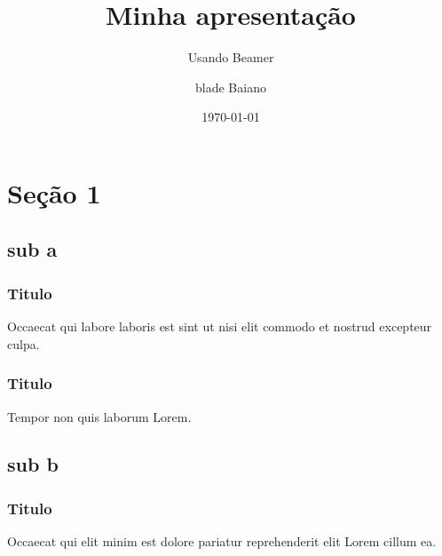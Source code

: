 \documentclass{beamer}
\title{Minha apresentação}
\subtitle{Usando Beamer}
\author{blade Baiano}
\institute{UFC}
\date{\today}
\begin{document}
    
    \begin{frame}
        \titlepage
    \end{frame}

    \begin{frame}
        \tableofcontents
    \end{frame}

    \section{Seção 1}
    \subsection{sub a}

    \begin{frame}
        \frametitle{Titulo}    
        Occaecat qui labore laboris est sint ut nisi elit commodo et nostrud excepteur culpa.
    \end{frame}
    
    \begin{frame}
        \frametitle{Titulo}
        Tempor non quis laborum Lorem.
    \end{frame}
    
    \subsection{sub b}

    \begin{frame}   
        \frametitle{Titulo}
        Occaecat qui elit minim est dolore pariatur reprehenderit elit Lorem cillum ea.         
    \end{frame} 
\end{document}
